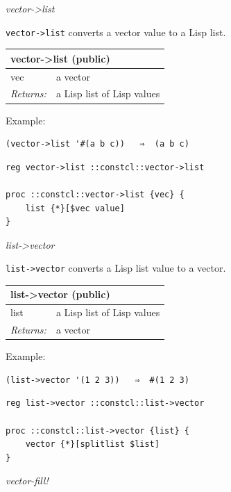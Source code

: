 \documentclass[twoside,9pt]{report}
\begin{document}
\emph{vector->list}


\texttt{vector->list} converts a vector value to a Lisp list.

\begin{tabular}{ |l l| }
\hline
\multicolumn{2}{|l|}{vector->list (public)} \\
\hline
vec & a vector \\
\textit{Returns:} & a Lisp list of Lisp values \\
\hline
\end{tabular}


Example:

\noindent\makebox[\linewidth]{\rule{\linewidth}{0.4pt}}
\begin{lstlisting}
(vector->list '#(a b c))   ⇒  (a b c)
\end{lstlisting}
\noindent\makebox[\linewidth]{\rule{\linewidth}{0.4pt}}
\noindent\makebox[\linewidth]{\rule{\linewidth}{0.4pt}}
\begin{lstlisting}
reg vector->list ::constcl::vector->list
 
proc ::constcl::vector->list {vec} {
    list {*}[$vec value]
}
\end{lstlisting}
\noindent\makebox[\linewidth]{\rule{\linewidth}{0.4pt}}

\emph{list->vector}


\texttt{list->vector} converts a Lisp list value to a vector.

\begin{tabular}{ |l l| }
\hline
\multicolumn{2}{|l|}{list->vector (public)} \\
\hline
list & a Lisp list of Lisp values \\
\textit{Returns:} & a vector \\
\hline
\end{tabular}


Example:

\noindent\makebox[\linewidth]{\rule{\linewidth}{0.4pt}}
\begin{lstlisting}
(list->vector '(1 2 3))   ⇒  #(1 2 3)
\end{lstlisting}
\noindent\makebox[\linewidth]{\rule{\linewidth}{0.4pt}}
\noindent\makebox[\linewidth]{\rule{\linewidth}{0.4pt}}
\begin{lstlisting}
reg list->vector ::constcl::list->vector
 
proc ::constcl::list->vector {list} {
    vector {*}[splitlist $list]
}
\end{lstlisting}
\noindent\makebox[\linewidth]{\rule{\linewidth}{0.4pt}}

\emph{vector-fill!}
\end{document}
